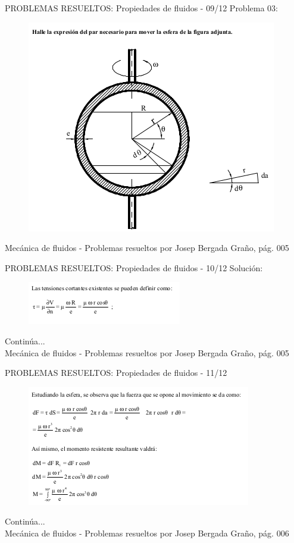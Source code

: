 \begin{frame}{PROBLEMAS RESUELTOS: Propiedades de fluidos - 09/12}
\justifying
Problema 03:
\begin{figure}[H]
\centering
\includegraphics[scale=0.4]{Section_Files/S2-imagenes-Jhon/Book-ProbResuelts/P03-E01.png}
\end{figure}
{\tiny Mecánica de fluidos - Problemas resueltos por Josep Bergada Graño, pág. 005}
\end{frame}

\begin{frame}{PROBLEMAS RESUELTOS: Propiedades de fluidos - 10/12}
\justifying
Solución:
\begin{figure}[H]
\centering
\includegraphics[scale=0.6]{Section_Files/S2-imagenes-Jhon/Book-ProbResuelts/P03-E02.png}
\end{figure}
Continúa...\\
{\tiny Mecánica de fluidos - Problemas resueltos por Josep Bergada Graño, pág. 005}
\end{frame}

\begin{frame}{PROBLEMAS RESUELTOS: Propiedades de fluidos - 11/12}
\justifying
\begin{figure}[H]
\centering
\includegraphics[scale=0.6]{Section_Files/S2-imagenes-Jhon/Book-ProbResuelts/P03-E03.png}
\end{figure}
Continúa...\\
{\tiny Mecánica de fluidos - Problemas resueltos por Josep Bergada Graño, pág. 006}
\end{frame}


